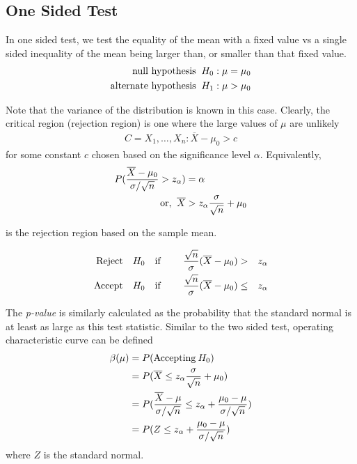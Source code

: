 \documentclass[../probability-notes.tex]{subfiles}
\begin{document}
    \subsection{One Sided Test}
    In one sided test, we test the equality of the mean with a fixed value vs a single sided inequality of the mean being larger than, or smaller than that fixed value.
    \begin{align*}
        \text{null hypothesis \:} H_{0}&: \mu = \mu_{0}\\
        \text{alternate hypothesis \:} H_{1}&: \mu > \mu_{0}
    \end{align*}

    Note that the variance of the distribution is known in this case. Clearly, the critical region (rejection region) is one where the large values of $\mu$ are unlikely
    \begin{align*}
        C = {X_{1}, \ldots, X_{n}: \overline{X} - \mu_{0} > c}
    \end{align*}
    for some constant $c$ chosen based on the significance level $\alpha$. Equivalently,
    \begin{align*}
        P(\frac{\overline{X} - \mu_{0}}{\sigma/\sqrt{n}} > z_{\alpha}) &= \alpha\\
        \text{or, \:} \overline{X} &> z_{\alpha}\frac{\sigma}{\sqrt{n}} + \mu_{0}
    \end{align*}

    is the rejection region based on the sample mean.

    \begin{alignat*}{4}
        \text{Reject\quad} &H_{0} \text{\quad if \quad} &\frac{\sqrt{n}}{\sigma}(\overline{X} - \mu_{0}) &> &z_{\alpha}\\
        \text{Accept\quad} &H_{0} \text{\quad if\quad} &\frac{\sqrt{n}}{\sigma}(\overline{X} - \mu_{0}) &\leq &z_{\alpha}\\
    \end{alignat*}

    The \emph{p-value} is similarly calculated as the probability that the standard normal is at least as large as this test statistic. Similar to the two sided test, operating characteristic curve can be defined
    \begin{align*}
        \beta(\mu) &= P(\text{Accepting\:} H_{0})\\
        &= P(\overline{X} \leq z_{\alpha}\frac{\sigma}{\sqrt{n}} + \mu_{0})\\
        &= P(\frac{\overline{X} - \mu}{\sigma/\sqrt{n}} \leq z_{\alpha} + \frac{\mu_{0} - \mu}{\sigma/\sqrt{n}})\\
        &= P(Z \leq z_{\alpha} + \frac{\mu_{0} - \mu}{\sigma/\sqrt{n}})
    \end{align*}
    where $Z$ is the standard normal.\newline
\end{document}
